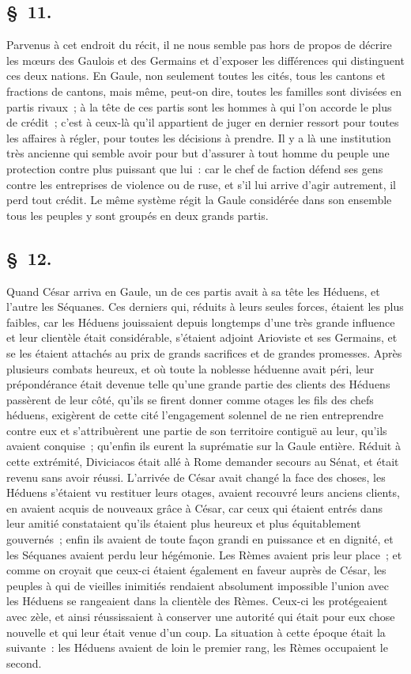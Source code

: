 \documentclass[french,twoside]{book} %
\begin{document}
\subsection[{§ 11.}]{ \textsc{§ 11.} }
\noindent Parvenus à cet endroit du récit, il ne nous semble pas hors de propos de décrire les mœurs des Gaulois et des Germains et d’exposer les différences qui distinguent ces deux nations. En Gaule, non seulement toutes les cités, tous les cantons et fractions de cantons, mais même, peut-on dire, toutes les familles sont divisées en partis rivaux ; à la tête de ces partis sont les hommes à qui l’on accorde le plus de crédit ; c’est à ceux-là qu’il appartient de juger en dernier ressort pour toutes les affaires à régler, pour toutes les décisions à prendre. Il y a là une institution très ancienne qui semble avoir pour but d’assurer à tout homme du peuple une protection contre plus puissant que lui : car le chef de faction défend ses gens contre les entreprises de violence ou de ruse, et s’il lui arrive d’agir autrement, il perd tout crédit. Le même système régit la Gaule considérée dans son ensemble tous les peuples y sont groupés en deux grands partis.
\subsection[{§ 12.}]{ \textsc{§ 12.} }
\noindent Quand César arriva en Gaule, un de ces partis avait à sa tête les Héduens, et l’autre les Séquanes. Ces derniers qui, réduits à leurs seules forces, étaient les plus faibles, car les Héduens jouissaient depuis longtemps d’une très grande influence et leur clientèle était considérable, s’étaient adjoint Arioviste et ses Germains, et se les étaient attachés au prix de grands sacrifices et de grandes promesses. Après plusieurs combats heureux, et où toute la noblesse héduenne avait péri, leur prépondérance était devenue telle qu’une grande partie des clients des Héduens passèrent de leur côté, qu’ils se firent donner comme otages les fils des chefs héduens, exigèrent de cette cité l’engagement solennel de ne rien entreprendre contre eux et s’attribuèrent une partie de son territoire contiguë au leur, qu’ils avaient conquise ; qu’enfin ils eurent la suprématie sur la Gaule entière. Réduit à cette extrémité, Diviciacos était allé à Rome demander secours au Sénat, et était revenu sans avoir réussi. L'arrivée de César avait changé la face des choses, les Héduens s’étaient vu restituer leurs otages, avaient recouvré leurs anciens clients, en avaient acquis de nouveaux grâce à César, car ceux qui étaient entrés dans leur amitié constataient qu’ils étaient plus heureux et plus équitablement gouvernés ; enfin ils avaient de toute façon grandi en puissance et en dignité, et les Séquanes avaient perdu leur hégémonie. Les Rèmes avaient pris leur place ; et comme on croyait que ceux-ci étaient également en faveur auprès de César, les peuples à qui de vieilles inimitiés rendaient absolument impossible l’union avec les Héduens se rangeaient dans la clientèle des Rèmes. Ceux-ci les protégeaient avec zèle, et ainsi réussissaient à conserver une autorité qui était pour eux chose nouvelle et qui leur était venue d’un coup. La situation à cette époque était la suivante : les Héduens avaient de loin le premier rang, les Rèmes occupaient le second.
\end{document}
